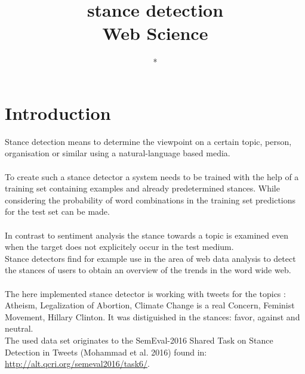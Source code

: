 \documentclass[a4paper,12pt,twoside]{article}
\title{stance detection\\ Web Science }
\author{*}
\begin{document}
\maketitle
\section{Introduction}
Stance detection means to determine the viewpoint on a certain topic, person, organisation or similar using a natural-language based media.\\ 
\\
To create such a stance detector a system needs to be trained with the help of a training set containing examples and already predetermined stances. While considering the probability of word combinations in the training set predictions for the test set can be made.\\
\\
In contrast to sentiment analysis the stance towards a topic is examined even when the target does not explicitely occur in the test medium. \\
Stance detectors find for example use in the area of web data analysis to detect the stances of users to obtain an overview of the trends in the word wide web. \\
\\
The here implemented stance detector is working with tweets for the topics : Atheism, Legalization of Abortion, Climate Change is a real Concern, Feminist Movement, Hillary Clinton. It was distiguished in the stances: favor, against and neutral.\\
The used data set originates to the SemEval-2016 Shared Task on Stance Detection in Tweets
(Mohammad et al. 2016)  found in: \url{http://alt.qcri.org/semeval2016/task6/}.
\end{document}

